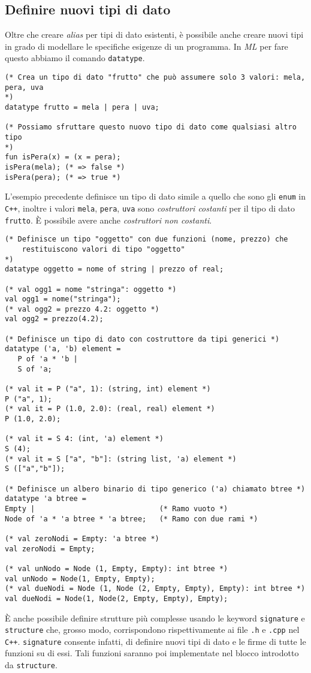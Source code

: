 \documentclass[12pt, a4paper]{report}
\theoremstyle{definition}
\newcommand{\code}[1]{\texttt{#1}}
\begin{document}
\subsection{Definire nuovi tipi di dato}
Oltre che creare \emph{alias} per tipi di dato esistenti, è possibile anche creare
nuovi tipi in grado di modellare le specifiche esigenze di un programma.
In \emph{ML} per fare questo abbiamo il comando \code{datatype}.

\begin{lstlisting}
(* Crea un tipo di dato "frutto" che può assumere solo 3 valori: mela, pera, uva
*)
datatype frutto = mela | pera | uva;

(* Possiamo sfruttare questo nuovo tipo di dato come qualsiasi altro tipo
*)
fun isPera(x) = (x = pera);
isPera(mela); (* => false *)
isPera(pera); (* => true *)
\end{lstlisting}
L'esempio precedente definisce un tipo di dato simile a quello che sono gli
\code{enum} in \code{C++}, inoltre i valori \code{mela}, \code{pera}, \code{uva}
sono \emph{costruttori costanti} per il tipo di dato \code{frutto}. È possibile
avere anche \emph{costruttori non costanti}.

\begin{lstlisting}
(* Definisce un tipo "oggetto" con due funzioni (nome, prezzo) che
    restituiscono valori di tipo "oggetto"
*)
datatype oggetto = nome of string | prezzo of real;

(* val ogg1 = nome "stringa": oggetto *)
val ogg1 = nome("stringa");
(* val ogg2 = prezzo 4.2: oggetto *)
val ogg2 = prezzo(4.2);

(* Definisce un tipo di dato con costruttore da tipi generici *)
datatype ('a, 'b) element =
   P of 'a * 'b |
   S of 'a;

(* val it = P ("a", 1): (string, int) element *)
P ("a", 1);
(* val it = P (1.0, 2.0): (real, real) element *)
P (1.0, 2.0);

(* val it = S 4: (int, 'a) element *)
S (4);
(* val it = S ["a", "b"]: (string list, 'a) element *)
S (["a","b"]);

(* Definisce un albero binario di tipo generico ('a) chiamato btree *)
datatype 'a btree =
Empty |                             (* Ramo vuoto *)
Node of 'a * 'a btree * 'a btree;   (* Ramo con due rami *)

(* val zeroNodi = Empty: 'a btree *)
val zeroNodi = Empty;

(* val unNodo = Node (1, Empty, Empty): int btree *)
val unNodo = Node(1, Empty, Empty);
(* val dueNodi = Node (1, Node (2, Empty, Empty), Empty): int btree *)
val dueNodi = Node(1, Node(2, Empty, Empty), Empty);
\end{lstlisting}
È anche possibile definire strutture più complesse usando le keyword
\code{signature} e \code{structure} che, grosso modo, corrispondono rispettivamente
ai file \code{.h} e \code{.cpp} nel \code{C++}. \code{signature} consente infatti,
di definire nuovi tipi di dato e le firme di tutte le funzioni su di essi. Tali
funzioni saranno poi implementate nel blocco introdotto da \code{structure}.
\end{document}
